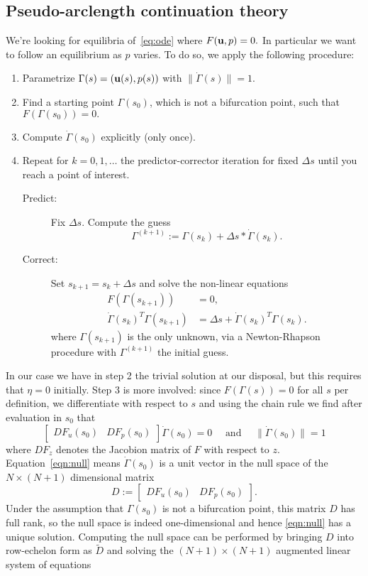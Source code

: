 \subsection{Pseudo-arclength continuation theory}
We're looking for equilibria of~\eqref{eq:ode} where $F(\mathbf{u}, p) = 0.$ In particular we want to follow an equilibrium as $p$ varies. To do so, we apply the following procedure:
\begin{enumerate}
  \item Parametrize $\Gamma(s) = (\mathbf{u}(s), p(s))$ with $\|\dot\Gamma(s)\| = 1.$
  \item Find a starting point $\Gamma(s_0)$, which is not a bifurcation point, such that $F(\Gamma(s_0)) = 0.$ 
  \item Compute $\dot\Gamma(s_0)$ explicitly (only once).
  \item Repeat for $k = 0, 1, \dots$ the predictor-corrector iteration for fixed $\Delta s$ until you reach a point of interest.
  \begin{description}
    \item[Predict:] Fix $\Delta s.$ Compute the guess $$\Gamma^{(k+1)} := \Gamma(s_k) + \Delta s * \dot\Gamma(s_k).$$
    \item[Correct:] Set $s_{k+1} = s_k + \Delta s$ and solve the non-linear equations \begin{equation}\begin{aligned}\label{eq:hoi}
      F(\Gamma(s_{k+1})) &= 0, \\
      \dot\Gamma(s_k)^T\Gamma(s_{k+1}) &= \Delta s + \dot\Gamma(s_k)^T\Gamma(s_k).
    \end{aligned}
    \end{equation}
    where $\Gamma(s_{k+1})$ is the only unknown, via a Newton-Rhapson procedure with $\Gamma^{(k+1)}$ the initial guess.
  \end{description}
\end{enumerate}
In our case we have in step 2 the trivial solution at our disposal, but this requires that $\eta = 0$ initially. Step 3 is more involved: since $F(\Gamma(s)) = 0$ for all $s$ per definition, we differentiate with respect to $s$ and using the chain rule we find after evaluation in $s_0$ that
\begin{equation}\label{eqn:null}
  \begin{bmatrix}
    DF_u(s_0) & DF_p(s_0)
  \end{bmatrix}\Dot\Gamma(s_0)
  = 0 \quad \text{ and } \quad \|\dot\Gamma(s_0)\| = 1
\end{equation}
where $DF_z$ denotes the Jacobion matrix of $F$ with respect to $z.$ Equation~\eqref{eqn:null} means $\dot\Gamma(s_0)$ is a unit vector in the null space of the $N \times (N + 1)$ dimensional matrix $$D := \begin{bmatrix} DF_u(s_0) & DF_p(s_0) \end{bmatrix}.$$ Under the assumption that $\Gamma(s_0)$ is not a bifurcation point, this matrix $D$ has full rank, so the null space is indeed one-dimensional and hence \eqref{eqn:null} has a unique solution. Computing the null space can be performed by bringing $D$ into row-echelon form as $\tilde{D}$ and solving the $(N + 1) \times (N + 1)$ augmented linear system of equations
